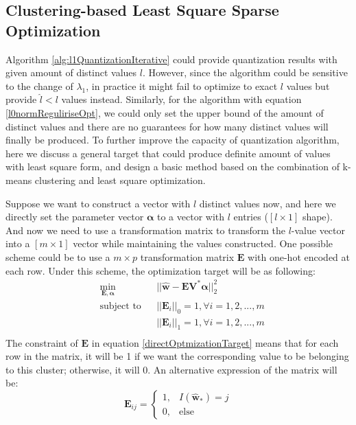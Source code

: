 \documentclass[preprint,10pt]{elsarticle}
\begin{document}
\subsection{Clustering-based Least Square Sparse Optimization}
Algorithm \ref{alg:l1QuantizationIterative} could provide quantization results with given amount of distinct values $l$. However, since the algorithm could be sensitive to the change of $\lambda_1$, in practice it might fail to optimize to exact $l$ values but provide $\hat{l}<l$ values instead. Similarly, for the algorithm with equation \ref{l0normReguliriseOpt}, we could only set the upper bound of the amount of distinct values and there are no guarantees for how many distinct values will finally be produced. To further improve the capacity of quantization algorithm, here we discuss a general target that could produce definite amount of values with least square form, and design a basic method based on the combination of k-means clustering and least square optimization.\par
Suppose we want to construct a vector with $l$ distinct values now, and here we directly set the parameter vector $\boldsymbol{\alpha}$ to a vector with $l$ entries ($[l \times 1]$ shape). And now we need to use a transformation matrix to transform the $l$-value vector into a $[m \times 1]$ vector while maintaining the values constructed. One possible scheme could be to use a $m \times p$ transformation matrix $\boldsymbol{E}$ with one-hot encoded at each row. Under this scheme, the optimization target will be as following:
\begin{equation}\label{directOptmizationTarget}
\begin{aligned}
& \underset{\boldsymbol{E},\boldsymbol{\alpha}}{\text{min}}
& & ||\boldsymbol{\hat{w}} -\boldsymbol{E}\boldsymbol{V^{*}}\boldsymbol{\alpha}||_{2}^{2} \\
& \text{subject to}
& & ||\boldsymbol{E}_{i}||_0 = 1, \forall i = 1,2,...,m\\
&&& ||\boldsymbol{E}_{i}||_1= 1, \forall i = 1,2,...,m\\
\end{aligned}
\end{equation}
The constraint of $\boldsymbol{E}$ in equation \ref{directOptmizationTarget} means that for each row in the matrix, it will be 1 if we want the corresponding value to be belonging to this cluster; otherwise, it will 0. An alternative expression of the matrix will be:\\
\begin{equation}
\label{EMatforCluster}
\boldsymbol{E}_{ij} = 
\begin{cases}
1, & I(\boldsymbol{\hat{w}_{*}}) = j \\
0, & \text{else}
\end{cases}
\end{equation}
\end{document}

